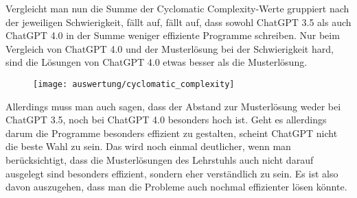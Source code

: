 \documentclass[class=scrbook, crop=false]{standalone}
\begin{document}
    Vergleicht man nun die Summe der Cyclomatic Complexity-Werte gruppiert nach der jeweiligen Schwierigkeit, fällt auf,
    fällt auf, dass sowohl ChatGPT 3.5 als auch ChatGPT 4.0 in der Summe weniger effiziente Programme schreiben.
    Nur beim Vergleich von ChatGPT 4.0 und der Musterlösung bei der Schwierigkeit hard, sind die Lösungen von ChatGPT 4.0
    etwas besser als die Musterlösung.
    \begin{figure}[H]
        \centering
        \texttt{[image: auswertung/cyclomatic\_complexity]}
        \caption{}
        \label{fig:4}
    \end{figure}
    Allerdings muss man auch sagen, dass der Abstand zur Musterlösung weder bei ChatGPT 3.5, noch bei ChatGPT 4.0 besonders
    hoch ist.
    Geht es allerdings darum die Programme besonders effizient zu gestalten, scheint ChatGPT nicht die beste Wahl zu sein.
    Das wird noch einmal deutlicher, wenn man berücksichtigt, dass die Musterlösungen des Lehrstuhls auch nicht darauf ausgelegt
    sind besonders effizient, sondern eher verständlich zu sein.
    Es ist also davon auszugehen, dass man die Probleme auch nochmal effizienter lösen könnte.

\ifstandalone
    \printglossary
    \printbibliography[heading=bibintoc]
\fi
\end{document}
